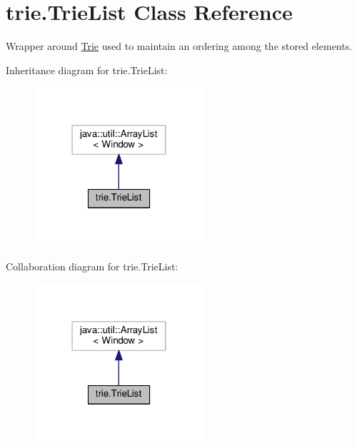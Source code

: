 \hypertarget{classtrie_1_1_trie_list}{}\section{trie.\+Trie\+List Class Reference}
\label{classtrie_1_1_trie_list}


Wrapper around \hyperlink{classtrie_1_1_trie}{Trie} used to maintain an ordering among the stored elements.  




Inheritance diagram for trie.\+Trie\+List\+:\nopagebreak
\begin{figure}[H]
\begin{center}
\leavevmode
\includegraphics[width=178pt]{classtrie_1_1_trie_list__inherit__graph}
\end{center}
\end{figure}


Collaboration diagram for trie.\+Trie\+List\+:\nopagebreak
\begin{figure}[H]
\begin{center}
\leavevmode
\includegraphics[width=178pt]{classtrie_1_1_trie_list__coll__graph}
\end{center}
\end{figure}
